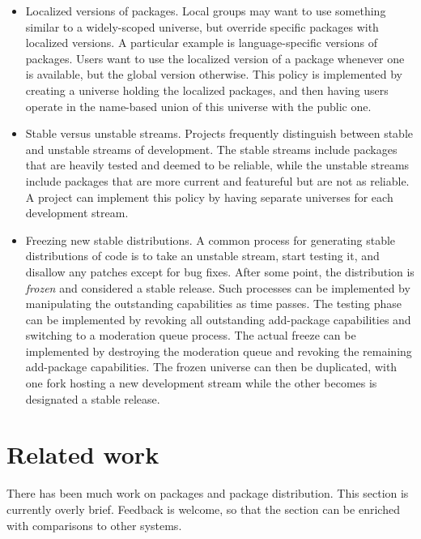 \documentclass{article}
\begin{document}
\begin{itemize}
\item Localized versions of packages.  Local groups may want to use
      something similar to a widely-scoped universe, but override
      specific packages with localized versions.  A particular example
      is language-specific versions of packages.  Users want to use
      the localized version of a package whenever one is available,
      but the global version otherwise.  This policy is implemented by
      creating a universe holding the localized packages, and then
      having users operate in the name-based union of this universe
      with the public one.

\item Stable versus unstable streams.  Projects frequently distinguish
      between stable and unstable streams of development.  The stable
      streams include packages that are heavily tested and deemed to
      be reliable, while the unstable streams include packages that
      are more current and featureful but are not as reliable.  A
      project can implement this policy by having separate universes
      for each development stream.  

\item Freezing new stable distributions.  A common process for
      generating stable distributions of code is to take an unstable
      stream, start testing it, and disallow any patches except for
      bug fixes.
      After some
      point, the distribution is \emph{frozen} and considered a stable
      release.  Such processes can be implemented by manipulating the
      outstanding capabilities as time passes.  The testing phase can
      be implemented by revoking all outstanding add-package
      capabilities and switching to a moderation queue process.  The
      actual freeze can be implemented by destroying the moderation
      queue and revoking the remaining add-package capabilities.  The
      frozen universe can then be duplicated, with one fork hosting
      a new development stream while the other becomes is designated
      a stable release.
\end{itemize}



\section{Related work}
There has been much work on packages and package distribution.  This
section is currently overly brief.  Feedback is welcome, so that the
section can be enriched with comparisons to other systems.
\end{document}
